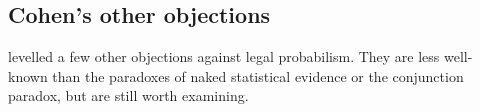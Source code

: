 \documentclass{article}
\newcommand{\pr}{\mathsf{Pr}}
\begin{document}






\subsection{Cohen's other objections}


\cite{Cohen1977The-probable-an} levelled a few other objections against legal probabilism. They are less well-known than the paradoxes of naked statistical evidence or the conjunction paradox, but are still worth examining. 



 
 
\end{document}
